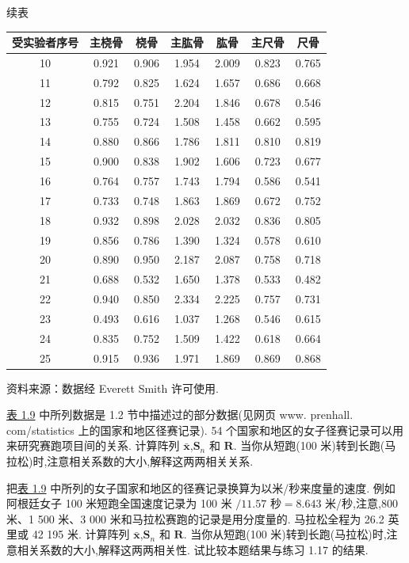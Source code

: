 
\begin{mvtable}
{ 续表}
\begin{tabular}{ccccccc}
\toprule
受实验者序号 & 主桡骨 & 桡骨 & 主肱骨 & 肱骨 & 主尺骨 & 尺骨 \\
\midrule
10 & 0.921 & 0.906 & 1.954 & 2.009 & 0.823 & 0.765 \\
11 & 0.792 & 0.825 & 1.624 & 1.657 & 0.686 & 0.668 \\
12 & 0.815 & 0.751 & 2.204 & 1.846 & 0.678 & 0.546 \\
13 & 0.755 & 0.724 & 1.508 & 1.458 & 0.662 & 0.595 \\
14 & 0.880 & 0.866 & 1.786 & 1.811 & 0.810 & 0.819 \\
15 & 0.900 & 0.838 & 1.902 & 1.606 & 0.723 & 0.677 \\
16 & 0.764 & 0.757 & 1.743 & 1.794 & 0.586 & 0.541 \\
17 & 0.733 & 0.748 & 1.863 & 1.869 & 0.672 & 0.752 \\
18 & 0.932 & 0.898 & 2.028 & 2.032 & 0.836 & 0.805 \\
19 & 0.856 & 0.786 & 1.390 & 1.324 & 0.578 & 0.610 \\
20 & 0.890 & 0.950 & 2.187 & 2.087 & 0.758 & 0.718 \\
21 & 0.688 & 0.532 & 1.650 & 1.378 & 0.533 & 0.482 \\
22 & 0.940 & 0.850 & 2.334 & 2.225 & 0.757 & 0.731 \\
23 & 0.493 & 0.616 & 1.037 & 1.268 & 0.546 & 0.615 \\
24 & 0.835 & 0.752 & 1.509 & 1.422 & 0.618 & 0.664 \\
25 & 0.915 & 0.936 & 1.971 & 1.869 & 0.869 & 0.868 \\
\bottomrule
\end{tabular}
\end{mvtable}

{ 资料来源：数据经 Everett Smith 许可使用.}

 \hyperref[tab:1.9]{表 1.9} 中所列数据是 1.2 节中描述过的部分数据(见网页 www. prenhall. com/statistics 上的国家和地区径赛记录). 54 个国家和地区的女子径赛记录可以用来研究赛跑项目间的关系. 计算阵列 $\bar{\bm{x}}$,$\bm{S}_n$ 和 $\bm{R}$. 当你从短跑(100 米)转到长跑(马拉松)时,注意相关系数的大小,解释这两两相关关系.

 把\hyperref[tab:1.9]{表 1.9} 中所列的女子国家和地区的径赛记录换算为以米/秒来度量的速度. 例如阿根廷女子 100 米短跑全国速度记录为 100 米 $/11.57$ 秒$=8.643$ 米/秒,注意,800 米、1 500 米、3 000 米和马拉松赛跑的记录是用分度量的. 马拉松全程为 26.2 英里或 42 195 米. 计算阵列 $\bar{\bm{x}}$,$\bm{S}_n$ 和 $\bm{R}$. 当你从短跑(100 米)转到长跑(马拉松)时,注意相关系数的大小,解释这两两相关性. 试比较本题结果与练习 1.17 的结果.

